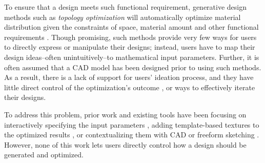 To ensure that a design meets such functional requirement, generative design methods such as \textit{topology optimization}
will automatically optimize material distribution given the constraints of space, material amount and other functional requirements \cite{sigmund200199}.
Though promising, such methods provide very few ways for users to directly express or manipulate their designs; instead, users have to map their design ideas--often unintuitively--to mathematical input parameters. Further, it is often assumed that a CAD model has been designed prior to using such methods. As a result, there is a lack of support for users' ideation process, and they have little direct control of the optimization's outcome \cite{zhou2016direct}, or ways to effectively iterate their designs.

To address this problem, prior work and existing tools have been focusing on interactively specifying the input parameters \cite{aage2013interactive, Stressto43:online}, adding template-based textures to the optimized results \cite{martinez2015structure}, or contextualizing them with CAD \cite{shea2003towards} or freeform sketching \cite{kazi2017dreamsketch}. However, none of this work lets users directly control how a design should be generated and optimized.


